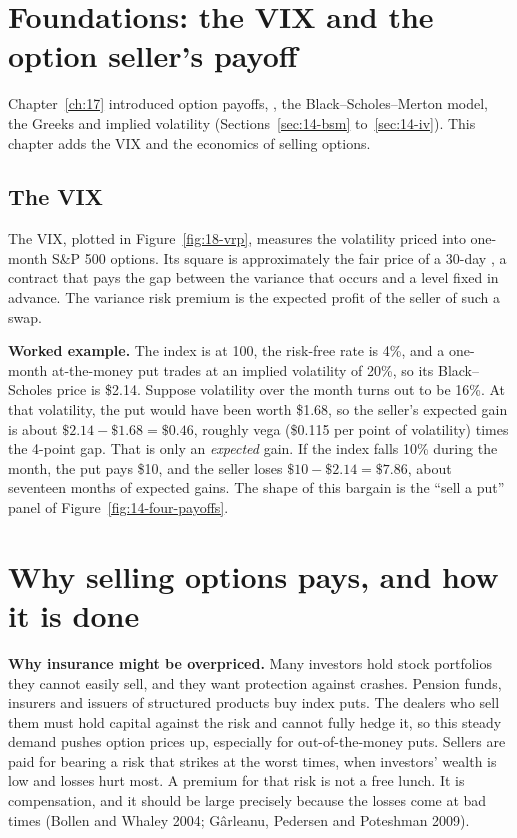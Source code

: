 \section{Foundations: the VIX and the option seller's payoff}
\label{sec:16-foundations}

Chapter~\ref{ch:17} introduced option payoffs, , the Black--Scholes--Merton model, the Greeks and implied volatility (Sections~\ref{sec:14-bsm} to~\ref{sec:14-iv}). This chapter adds the VIX and the economics of selling options.
\subsection{The VIX}

The VIX,  plotted in Figure~\ref{fig:18-vrp}, measures the volatility priced into one-month S\&P 500 options. Its square is approximately the fair price of a 30-day , a contract that pays the gap between the variance that occurs and a level fixed in advance. The variance risk premium is the expected profit of the seller of such a swap.

\textbf{Worked example.} The index is at 100, the risk-free rate is 4\%, and a one-month at-the-money put trades at an implied volatility of 20\%, so its Black--Scholes price is \$2.14. Suppose volatility over the month turns out to be 16\%. At that volatility, the put would have been worth \$1.68, so the seller's expected gain is about $\$2.14 - \$1.68 = \$0.46$, roughly vega (\$0.115 per point of volatility) times the 4-point gap. That is only an \emph{expected} gain. If the index falls 10\% during the month, the put pays \$10, and the seller loses $\$10 - \$2.14 = \$7.86$, about seventeen months of expected gains. The shape of this bargain is the ``sell a put'' panel of Figure~\ref{fig:14-four-payoffs}.


\section{Why selling options pays, and how it is done}
\label{sec:16-how}

\textbf{Why insurance might be overpriced.} Many investors hold stock portfolios they cannot easily sell, and they want protection against crashes. Pension funds, insurers and issuers of structured products buy index puts. The dealers who sell them must hold capital against the risk and cannot fully hedge it, so this steady demand pushes option prices up, especially for out-of-the-money puts. Sellers are paid for bearing a risk that strikes at the worst times, when investors' wealth is low and losses hurt most. A premium for that risk is not a free lunch. It is compensation, and it should be large precisely because the losses come at bad times (Bollen and Whaley 2004; G\^arleanu, Pedersen and Poteshman 2009).


